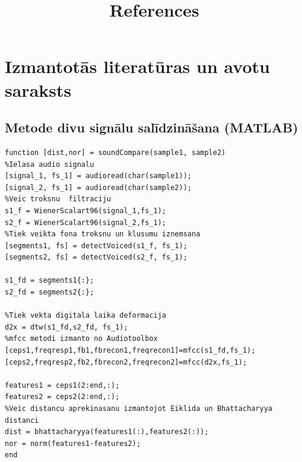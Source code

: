 \documentclass[12pt,paper=A4]{report}
\begin{document}
\chapter*{Izmantotās literatūras un avotu saraksts}

\title{References}
\begingroup
   \def\chapter*#1{}


\endgroup

\appendix
\chapter*{Pielikumi}

\section{Metode divu signālu salīdzināšana (MATLAB)}
\label{appendix:piel1}
\begin{lstlisting}
function [dist,nor] = soundCompare(sample1, sample2)
%Ielasa audio signalu
[signal_1, fs_1] = audioread(char(sample1));
[signal_2, fs_1] = audioread(char(sample2));
%Veic troksnu  filtraciju
s1_f = WienerScalart96(signal_1,fs_1);
s2_f = WienerScalart96(signal_2,fs_1);
%Tiek veikta fona troksnu un klusumu iznemsana
[segments1, fs] = detectVoiced(s1_f, fs_1);
[segments2, fs] = detectVoiced(s2_f, fs_1);

s1_fd = segments1{:};
s2_fd = segments2{:};

%Tiek vekta digitala laika deformacija
d2x = dtw(s1_fd,s2_fd, fs_1);
%mfcc metodi izmanto no Audiotoolbox
[ceps1,freqresp1,fb1,fbrecon1,freqrecon1]=mfcc(s1_fd,fs_1);
[ceps2,freqresp2,fb2,fbrecon2,freqrecon2]=mfcc(d2x,fs_1);

features1 = ceps1(2:end,:);
features2 = ceps2(2:end,:);
%Veic distancu aprekinasanu izmantojot Eiklida un Bhattacharyya distanci
dist = bhattacharyya(features1(:),features2(:));
nor = norm(features1-features2);
end
\end{lstlisting}
\end{document}
